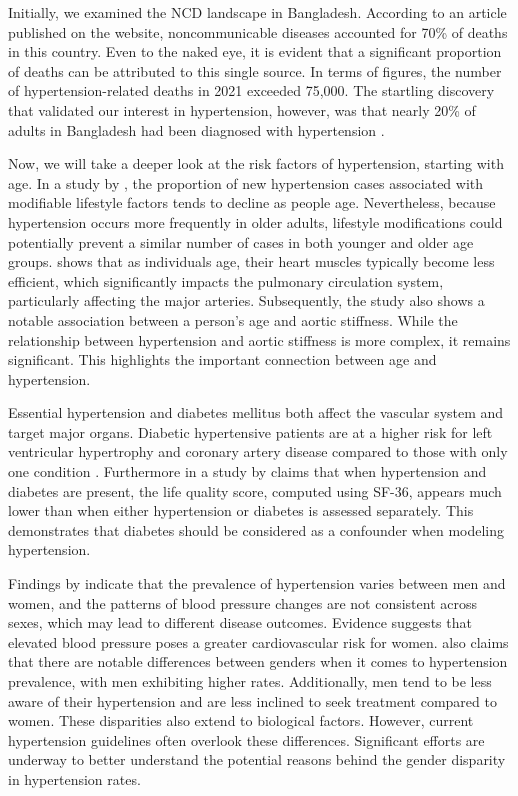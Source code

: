 \documentclass[
  12pt,
  a4paper]{article}
\begin{document}
Initially, we examined the NCD landscape in Bangladesh. According to an article published on the \citet{icddrb_icddrb_2021} website, noncommunicable diseases accounted for 70\% of deaths in this country. Even to the naked eye, it is evident that a significant proportion of deaths can be attributed to this single source. In terms of figures, the number of hypertension-related deaths in 2021 exceeded 75,000. The startling discovery that validated our interest in hypertension, however, was that nearly 20\% of adults in Bangladesh had been diagnosed with hypertension \citep{rahman_prevalence_2018}.

Now, we will take a deeper look at the risk factors of hypertension, starting with age. In a study by \citet{cohen_influence_2012}, the proportion of new hypertension cases associated with modifiable lifestyle factors tends to decline as people age. Nevertheless, because hypertension occurs more frequently in older adults, lifestyle modifications could potentially prevent a similar number of cases in both younger and older age groups. \citet{mceniery_age_2007} shows that as individuals age, their heart muscles typically become less efficient, which significantly impacts the pulmonary circulation system, particularly affecting the major arteries. Subsequently, the study also shows a notable association between a person's age and aortic stiffness. While the relationship between hypertension and aortic stiffness is more complex, it remains significant. This highlights the important connection between age and hypertension.

Essential hypertension and diabetes mellitus both affect the vascular system and target major organs. Diabetic hypertensive patients are at a higher risk for left ventricular hypertrophy and coronary artery disease compared to those with only one condition \citep{grossman2008hypertension}. Furthermore in a study by \citet{10.1097/HJR.0b013e3280803f29} claims that when hypertension and diabetes are present, the life quality score, computed using SF-36, appears much lower than when either hypertension or diabetes is assessed separately. This demonstrates that diabetes should be considered as a confounder when modeling hypertension.

Findings by \citet{connelly2022sex} indicate that the prevalence of hypertension varies between men and women, and the patterns of blood pressure changes are not consistent across sexes, which may lead to different disease outcomes. Evidence suggests that elevated blood pressure poses a greater cardiovascular risk for women. \citep{song_gender_2020} also claims that there are notable differences between genders when it comes to hypertension prevalence, with men exhibiting higher rates. Additionally, men tend to be less aware of their hypertension and are less inclined to seek treatment compared to women. These disparities also extend to biological factors. However, current hypertension guidelines often overlook these differences. Significant efforts are underway to better understand the potential reasons behind the gender disparity in hypertension rates.
\end{document}
